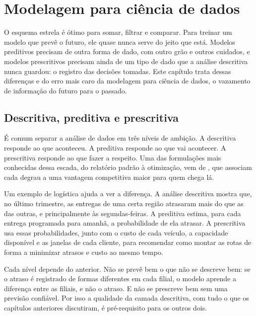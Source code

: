 \chapter{Modelagem para ciência de dados}
\label{cap:modelagem-cd}

O esquema estrela é ótimo para somar, filtrar e comparar. Para treinar um modelo que prevê o
futuro, ele quase nunca serve do jeito que está. Modelos preditivos precisam de outra forma
de dado, com outro grão e outros cuidados, e modelos prescritivos precisam ainda de um tipo
de dado que a análise descritiva nunca guardou: o registro das decisões tomadas. Este
capítulo trata dessas diferenças e do erro mais caro da modelagem para ciência de dados, o
vazamento de informação do futuro para o passado.

\section{Descritiva, preditiva e prescritiva}
\label{sec:tres-niveis}

É comum separar a análise de dados em três níveis de ambição. A descritiva responde ao que
aconteceu. A preditiva responde ao que vai acontecer. A prescritiva responde ao que fazer a
respeito. Uma das formulações mais conhecidas dessa escada, do relatório padrão à
otimização, vem de \textcite{davenport2007}, que associam cada degrau a uma vantagem
competitiva maior para quem chega lá.

Um exemplo de logística ajuda a ver a diferença. A análise descritiva mostra que, no último
trimestre, as entregas de uma certa região atrasaram mais do que as das outras, e
principalmente às segundas-feiras. A preditiva estima, para cada entrega programada para
amanhã, a probabilidade de ela atrasar. A prescritiva usa essas probabilidades, junto com o
custo de cada veículo, a capacidade disponível e as janelas de cada cliente, para recomendar
como montar as rotas de forma a minimizar atrasos e custo ao mesmo tempo.

Cada nível depende do anterior. Não se prevê bem o que não se descreve bem: se o atraso é
registrado de formas diferentes em cada filial, o modelo aprende a diferença entre as
filiais, e não o atraso. E não se prescreve bem sem uma previsão confiável. Por isso a
qualidade da camada descritiva, com tudo o que os capítulos anteriores discutiram, é
pré-requisito para os outros dois.


